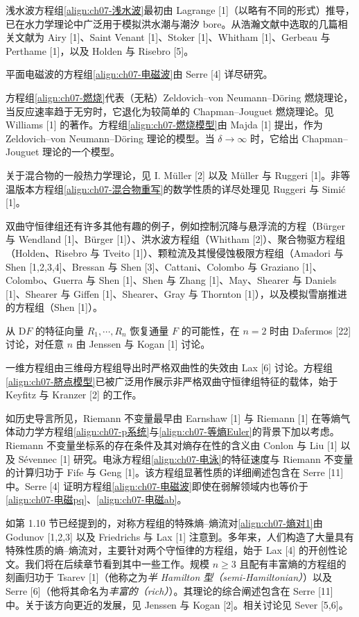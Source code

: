 \documentclass[../../main.tex]{subfiles}
\begin{document}
浅水波方程组\eqref{align:ch07-浅水波}最初由 Lagrange [1]（以略有不同的形式）推导，已在水力学理论中广泛用于模拟洪水潮与潮汐 bore。从浩瀚文献中选取的几篇相关文献为 Airy [1]、Saint Venant [1]、Stoker [1]、Whitham [1]、Gerbeau 与 Perthame [1]，以及 Holden 与 Risebro [5]。

平面电磁波的方程组\eqref{align:ch07-电磁波}由 Serre [4] 详尽研究。

方程组\eqref{align:ch07-燃烧}代表（无粘）Zeldovich--von Neumann--Döring 燃烧理论，当反应速率趋于无穷时，它退化为较简单的 Chapman--Jouguet 燃烧理论。见 Williams [1] 的著作。方程组\eqref{align:ch07-燃烧模型}由 Majda [1] 提出，作为 Zeldovich--von Neumann--Döring 理论的模型。当 $\delta\to\infty$ 时，它给出 Chapman--Jouguet 理论的一个模型。

关于混合物的一般热力学理论，见 I. Müller [2] 以及 Müller 与 Ruggeri [1]。非等温版本方程组\eqref{align:ch07-混合物重写}的数学性质的详尽处理见 Ruggeri 与 Simić [1]。

双曲守恒律组还有许多其他有趣的例子，例如控制沉降与悬浮流的方程（Bürger 与 Wendland [1]、Bürger [1]）、洪水波方程组（Whitham [2]）、聚合物驱方程组（Holden、Risebro 与 Tveito [1]）、颗粒流及其慢侵蚀极限方程组（Amadori 与 Shen [1,2,3,4]、Bressan 与 Shen [3]、Cattani、Colombo 与 Graziano [1]、Colombo、Guerra 与 Shen [1]、Shen 与 Zhang [1]、May、Shearer 与 Daniels [1]、Shearer 与 Giffen [1]、Shearer、Gray 与 Thornton [1]），以及模拟雪崩推进的方程组（Shen [1]）。

从 $\mathrm{D}F$ 的特征向量 $R_1,\cdots,R_n$ 恢复通量 $F$ 的可能性，在 $n=2$ 时由 Dafermos [22] 讨论，对任意 $n$ 由 Jenssen 与 Kogan [1] 讨论。

一维方程组由三维母方程组导出时严格双曲性的失效由 Lax [6] 讨论。方程组\eqref{align:ch07-脐点模型}已被广泛用作展示非严格双曲守恒律组特征的载体，始于 Keyfitz 与 Kranzer [2] 的工作。

如历史导言所见，Riemann 不变量最早由 Earnshaw [1] 与 Riemann [1] 在等熵气体动力学方程组\eqref{align:ch07-p系统}与\eqref{align:ch07-等熵Euler}的背景下加以考虑。Riemann 不变量坐标系的存在条件及其对熵存在性的含义由 Conlon 与 Liu [1] 以及 Sévennec [1] 研究。电泳方程组\eqref{align:ch07-电泳}的特征速度与 Riemann 不变量的计算归功于 Fife 与 Geng [1]。该方程组显著性质的详细阐述包含在 Serre [11] 中。Serre [4] 证明方程组\eqref{align:ch07-电磁波}即使在弱解领域内也等价于\eqref{align:ch07-电磁pq}、\eqref{align:ch07-电磁ab}。

如第 1.10 节已经提到的，对称方程组的特殊熵--熵流对\eqref{align:ch07-熵对1}由 Godunov [1,2,3] 以及 Friedrichs 与 Lax [1] 注意到。多年来，人们构造了大量具有特殊性质的熵--熵流对，主要针对两个守恒律的方程组，始于 Lax [4] 的开创性论文。我们将在后续章节看到其中一些工作。规模 $n\geqslant 3$ 且配有丰富熵的方程组的刻画归功于 Tsarev [1]（他称之为\emph{半 Hamilton 型（semi-Hamiltonian）}）以及 Serre [6]（他将其命名为\emph{丰富的（rich）}）。其理论的综合阐述包含在 Serre [11] 中。关于该方向更近的发展，见 Jenssen 与 Kogan [2]。相关讨论见 Sever [5,6]。
\end{document}
